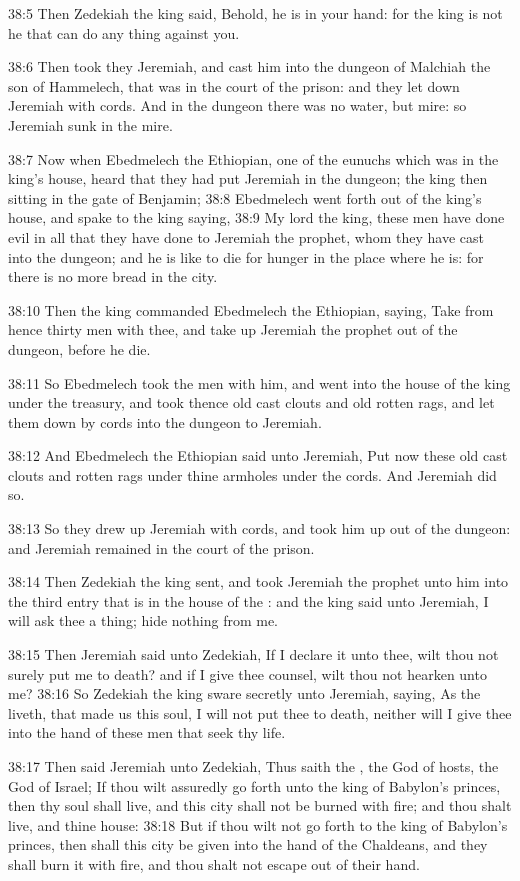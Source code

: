 38:5 Then Zedekiah the king said, Behold, he is in your hand: for the
king is not he that can do any thing against you.

38:6 Then took they Jeremiah, and cast him into the dungeon of
Malchiah the son of Hammelech, that was in the court of the prison:
and they let down Jeremiah with cords. And in the dungeon there was no
water, but mire: so Jeremiah sunk in the mire.

38:7 Now when Ebedmelech the Ethiopian, one of the eunuchs which was
in the king's house, heard that they had put Jeremiah in the dungeon;
the king then sitting in the gate of Benjamin; 38:8 Ebedmelech went
forth out of the king's house, and spake to the king saying, 38:9 My
lord the king, these men have done evil in all that they have done to
Jeremiah the prophet, whom they have cast into the dungeon; and he is
like to die for hunger in the place where he is: for there is no more
bread in the city.

38:10 Then the king commanded Ebedmelech the Ethiopian, saying, Take
from hence thirty men with thee, and take up Jeremiah the prophet out
of the dungeon, before he die.

38:11 So Ebedmelech took the men with him, and went into the house of
the king under the treasury, and took thence old cast clouts and old
rotten rags, and let them down by cords into the dungeon to Jeremiah.

38:12 And Ebedmelech the Ethiopian said unto Jeremiah, Put now these
old cast clouts and rotten rags under thine armholes under the cords.
And Jeremiah did so.

38:13 So they drew up Jeremiah with cords, and took him up out of the
dungeon: and Jeremiah remained in the court of the prison.

38:14 Then Zedekiah the king sent, and took Jeremiah the prophet unto
him into the third entry that is in the house of the \LORD: and the
king said unto Jeremiah, I will ask thee a thing; hide nothing from
me.

38:15 Then Jeremiah said unto Zedekiah, If I declare it unto thee,
wilt thou not surely put me to death? and if I give thee counsel, wilt
thou not hearken unto me?  38:16 So Zedekiah the king sware secretly
unto Jeremiah, saying, As the \LORD liveth, that made us this soul, I
will not put thee to death, neither will I give thee into the hand of
these men that seek thy life.

38:17 Then said Jeremiah unto Zedekiah, Thus saith the \LORD, the God
of hosts, the God of Israel; If thou wilt assuredly go forth unto the
king of Babylon's princes, then thy soul shall live, and this city
shall not be burned with fire; and thou shalt live, and thine house:
38:18 But if thou wilt not go forth to the king of Babylon's princes,
then shall this city be given into the hand of the Chaldeans, and they
shall burn it with fire, and thou shalt not escape out of their hand.

